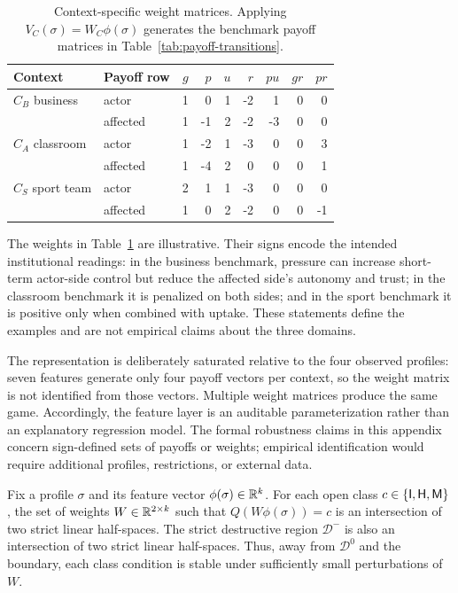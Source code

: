 \begin{table}[t]
\centering
\small
\begin{tabular}{llrrrrrrr}
\toprule
Context & Payoff row & $g$ & $p$ & $u$ & $r$ & $pu$ & $gr$ & $pr$\\
\midrule
$C_B$ business & actor & 1 & 0 & 1 & -2 & 1 & 0 & 0\\
 & affected & 1 & -1 & 2 & -2 & -3 & 0 & 0\\
\midrule
$C_A$ classroom & actor & 1 & -2 & 1 & -3 & 0 & 0 & 3\\
 & affected & 1 & -4 & 2 & 0 & 0 & 0 & 1\\
\midrule
$C_S$ sport team & actor & 2 & 1 & 1 & -3 & 0 & 0 & 0\\
 & affected & 1 & 0 & 2 & -2 & 0 & 0 & -1\\
\bottomrule
\end{tabular}
\caption{Context-specific weight matrices. Applying $V_C(\sigma)=W_C\phi(\sigma)$ generates the benchmark payoff matrices in Table~\ref{tab:payoff-transitions}.}
\label{tab:weights}
\end{table}

The weights in Table~\ref{tab:weights} are illustrative. Their signs encode the intended institutional readings: in the business benchmark, pressure can increase short-term actor-side control but reduce the affected side's autonomy and trust; in the classroom benchmark it is penalized on both sides; and in the sport benchmark it is positive only when combined with uptake. These statements define the examples and are not empirical claims about the three domains.

The representation is deliberately saturated relative to the four observed profiles: seven features generate only four payoff vectors per context, so the weight matrix is not identified from those vectors. Multiple weight matrices produce the same game. Accordingly, the feature layer is an auditable parameterization rather than an explanatory regression model. The formal robustness claims in this appendix concern sign-defined sets of payoffs or weights; empirical identification would require additional profiles, restrictions, or external data.


\begin{proposition}
\label{prop:weight-space-regions}
Fix a profile $\sigma$ and its feature vector $\phi(\sigma)\in\mathbb{R}^k$. For each open class $c\in\{\mathsf{I},\mathsf{H},\mathsf{M}\}$, the set of weights $W\in\mathbb{R}^{2\times k}$ such that $Q(W\phi(\sigma))=c$ is an intersection of two strict linear half-spaces. The strict destructive region $\mathcal D^-$ is also an intersection of two strict linear half-spaces. Thus, away from $\mathcal D^0$ and the boundary, each class condition is stable under sufficiently small perturbations of $W$.
\end{proposition}

